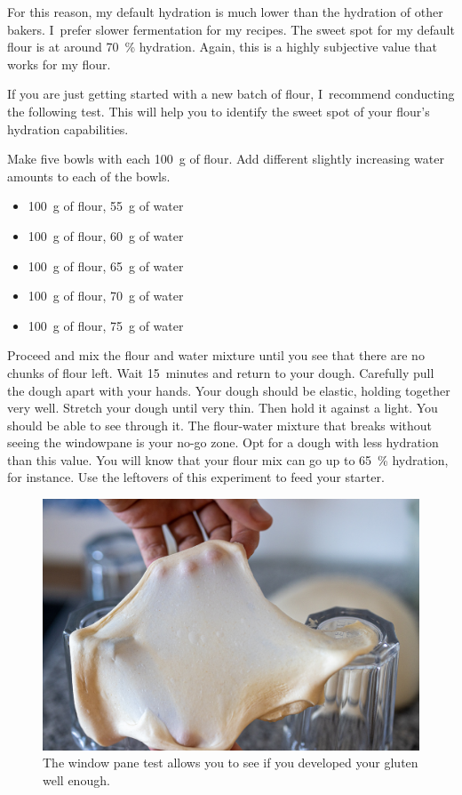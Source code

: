 For this reason, my default hydration is much lower than the hydration of other
bakers. I~prefer slower fermentation for my recipes.
The sweet spot for my default flour is at around \qty{70}{\percent} hydration.
Again, this is a highly subjective value that works for my flour.

If you are just getting started with a new batch of flour,
I~recommend conducting the following test. This will help you to
identify the sweet spot of your flour's hydration capabilities.

Make five bowls with each \qty{100}{\gram} of flour. Add different slightly
increasing water amounts to each of the bowls.

\begin{itemize}
  \item \qty{100}{\gram} of flour, \qty{55}{\gram} of water
  \item \qty{100}{\gram} of flour, \qty{60}{\gram} of water
  \item \qty{100}{\gram} of flour, \qty{65}{\gram} of water
  \item \qty{100}{\gram} of flour, \qty{70}{\gram} of water
  \item \qty{100}{\gram} of flour, \qty{75}{\gram} of water
\end{itemize}

Proceed and mix the flour and water mixture until you see that there
are no chunks of flour left. Wait 15~minutes and return to your dough.
Carefully pull the dough apart with your hands. Your dough should be elastic, holding
together very well. Stretch your dough until very thin. Then hold it against a light.
You should be able to see through it. The flour-water mixture that breaks without
seeing the windowpane is your no-go zone. Opt for a dough with
less hydration than this value. You will know that your flour mix can go up to
 \qty{65}{\percent} hydration, for instance. Use the leftovers of this experiment
to feed your starter.


\begin{figure}[!htb]
  \centering
  \includegraphics[width=\textwidth]{window-pane-effect}
  \caption[The window pane test]{The window pane test allows you to see if you
      developed your gluten well enough.}
\end{figure}


